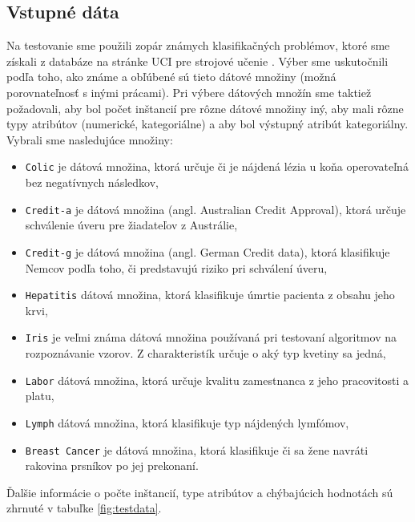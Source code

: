 \subsection{Vstupné dáta}
Na testovanie sme použili zopár známych klasifikačných problémov, ktoré sme získali z databáze na stránke UCI pre strojové učenie \cite{online-uci}. Výber sme uskutočnili podľa toho, ako známe a obľúbené sú tieto dátové množiny (možná porovnateľnosť s inými prácami). Pri výbere dátových množín sme taktiež požadovali, aby bol počet inštancií pre rôzne dátové množiny iný, aby mali rôzne typy atribútov (numerické, kategoriálne) a aby bol výstupný atribút kategoriálny. Vybrali sme nasledujúce množiny:
\begin{itemize}
\item \verb|Colic| je dátová množina, ktorá určuje či je nájdená lézia u koňa operovateľná bez negatívnych následkov,
\item \verb|Credit-a| je dátová množina (angl. Australian Credit Approval), ktorá určuje schválenie úveru pre žiadateľov z Austrálie,
\item \verb|Credit-g| je dátová množina (angl. German Credit data), ktorá klasifikuje Nemcov podľa toho, či predstavujú riziko pri schválení úveru,
\item \verb|Hepatitis| dátová množina, ktorá klasifikuje úmrtie pacienta z obsahu jeho krvi,
\item \verb|Iris| je veľmi známa dátová množina používaná pri testovaní algoritmov na rozpoznávanie vzorov. Z charakteristík určuje o aký typ kvetiny sa jedná,
\item \verb|Labor| dátová množina, ktorá určuje kvalitu zamestnanca z jeho pracovitosti a platu,
\item \verb|Lymph| dátová množina, ktorá klasifikuje typ nájdených lymfómov,
\item \verb|Breast Cancer| je dátová množina, ktorá klasifikuje či sa žene navráti rakovina prsníkov po jej prekonaní.
\end{itemize}

Ďalšie informácie o počte inštancií, type atribútov a chýbajúcich hodnotách
sú zhrnuté v tabuľke \ref{fig:testdata}.

